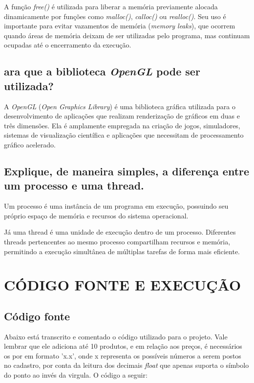 \documentclass[12pt, a4paper, brazil]{article}
\begin{document}
A função \textit{free()} é utilizada para liberar a memória previamente alocada dinamicamente por funções como \textit{malloc()}, \textit{calloc()} ou \textit{realloc()}. Seu uso é importante para evitar vazamentos de memória (\textit{memory leaks}), que ocorrem quando áreas de memória deixam de ser utilizadas pelo programa, mas continuam ocupadas até o encerramento da execução.

\subsection{ara que a biblioteca \textit{OpenGL} pode ser utilizada?}

A \textit{OpenGL} (\textit{Open Graphics Library}) é uma biblioteca gráfica utilizada para o desenvolvimento de aplicações que realizam renderização de gráficos em duas e três dimensões. Ela é amplamente empregada na criação de jogos, simuladores, sistemas de visualização científica e aplicações que necessitam de processamento gráfico acelerado.

\subsection{Explique, de maneira simples, a diferença entre um processo e uma thread.}

Um processo é uma instância de um programa em execução, possuindo seu próprio espaço de memória e recursos do sistema operacional. 

Já uma thread é uma unidade de execução dentro de um processo. Diferentes threads pertencentes ao mesmo processo compartilham recursos e memória, permitindo a execução simultânea de múltiplas tarefas de forma mais eficiente.

\section{CÓDIGO FONTE E EXECUÇÃO}

\subsection{Código fonte}
Abaixo está transcrito e comentado o código utilizado para o projeto. Vale lembrar que ele adiciona até 10 produtos, e em relação aos preços, é necessários os por em formato 'x.x', onde x representa os possíveis números a serem postos no cadastro, por conta da leitura dos decimais \textit{float} que apenas suporta o símbolo do ponto ao invés da virgula. O código a seguir:
\vspace{0.3cm}
\end{document}
